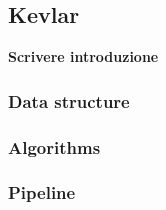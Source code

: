 \documentclass[../main.tex]{subfiles}
\begin{document}
\subsection{Kevlar}
\label{kevlar}

\textbf{Scrivere introduzione}

\subsubsection{Data structure}
\subsubsection{Algorithms}
\subsubsection{Pipeline}
\end{document}
